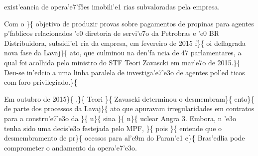 exist'eancia de opera'e7'f5es imobili'e1 rias subvaloradas pela empresa.
\par Com o \}\{\rtlch{}  \ltrch{}
 objetivo de produzir provas sobre
pagamentos de propinas para agentes p'fablicos relacionados 'e0
diretoria de servi'e7o da Petrobras e 'e0 BR Distribuidora, subsidi'e1
ria da empresa, em fevereiro de 2015 f\}\{\rtlch{}  \ltrch{}
 oi deflagrada nova fase da Lavaj\}\{\rtlch{} 
\ltrch{}  ato, que culminou na den'fa
ncia de 47 parlamentares, a qual foi acolhida pelo ministro do STF Teori
Zavascki em mar'e7o de 2015.\}\{\rtlch{}  \ltrch{}
 Deu-se in'edcio a uma linha paralela de investiga'e7'e3o
de agentes pol'ed ticos com foro privilegiado.\}\{\rtlch{} 
\ltrch{} \\
\par Em outubro de 2015\}\{\rtlch{}  \ltrch{} 
,\}\{\rtlch{}  \ltrch{}  Teori
\}\{\rtlch{}  \ltrch{}  Zavascki determinou o
desmembram\}\{\rtlch{}  \ltrch{}
 ento\}\{\rtlch{}  \ltrch{}
 de parte dos processos da Lavaj\}\{\rtlch{} 
\ltrch{}  ato que apuravam
irregularidades em contratos para a constru'e7'e3o da \}\{ \rtlch{}
 \ltrch{}  u\}\{\rtlch{}  \ltrch{}
 sina \}\{\rtlch{}  \ltrch{}
 n\}\{\rtlch{}  \ltrch{}
 uclear Angra 3. Embora, n 'e3o tenha
sido uma decis'e3o festejada pelo MPF, \}\{\rtlch{}  \ltrch{}
 pois \}\{\rtlch{}  \ltrch{}
 entende que o desmembramento de
pr\}\{\rtlch{}  \ltrch{}  ocessos para al'e9m
do Paran'e1 e\}\{\rtlch{}  \ltrch{}
 Bras'edlia pode comprometer o andamento
da opera'e7'e3o.
